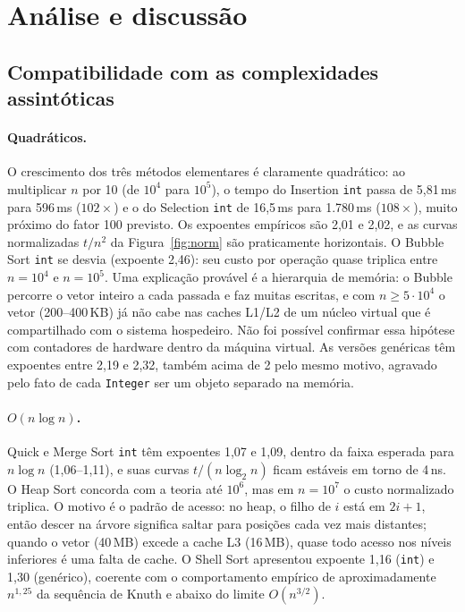 \documentclass[11pt,a4paper]{article}
\begin{document}
\section{Análise e discussão}

\subsection{Compatibilidade com as complexidades assintóticas}

\paragraph{Quadráticos.} O crescimento dos três métodos elementares é claramente quadrático: ao
multiplicar $n$ por 10 (de $10^4$ para $10^5$), o tempo do Insertion \texttt{int} passa de 5,81\,ms
para 596\,ms ($102\times$) e o do Selection \texttt{int} de 16,5\,ms para 1.780\,ms ($108\times$),
muito próximo do fator 100 previsto. Os expoentes empíricos são 2,01 e 2,02, e as curvas
normalizadas $t/n^2$ da Figura~\ref{fig:norm} são praticamente horizontais. O Bubble Sort
\texttt{int} se desvia (expoente 2,46): seu custo por operação quase triplica entre $n=10^4$ e
$n=10^5$. Uma explicação provável é a hierarquia de memória: o Bubble percorre o vetor inteiro a
cada passada e faz muitas escritas, e com $n \ge 5\cdot10^4$ o vetor (200--400\,KB) já não cabe nas
caches L1/L2 de um núcleo virtual que é compartilhado com o sistema hospedeiro. Não foi possível
confirmar essa hipótese com contadores de hardware dentro da máquina virtual. As versões genéricas
têm expoentes entre 2,19 e 2,32, também acima de 2 pelo mesmo motivo, agravado pelo fato de cada
\texttt{Integer} ser um objeto separado na memória.

\paragraph{$O(n\log n)$.} Quick e Merge Sort \texttt{int} têm expoentes 1,07 e 1,09, dentro da
faixa esperada para $n\log n$ (1,06--1,11), e suas curvas $t/(n\log_2 n)$ ficam estáveis em torno
de 4\,ns. O Heap Sort concorda com a teoria até $10^6$, mas em $n=10^7$ o custo normalizado
triplica. O motivo é o padrão de acesso: no heap, o filho de $i$ está em $2i+1$, então descer na
árvore significa saltar para posições cada vez mais distantes; quando o vetor (40\,MB) excede a
cache L3 (16\,MB), quase todo acesso nos níveis inferiores é uma falta de cache. O Shell Sort
apresentou expoente 1,16 (\texttt{int}) e 1,30 (genérico), coerente com o comportamento empírico de
aproximadamente $n^{1{,}25}$ da sequência de Knuth e abaixo do limite $O(n^{3/2})$.
\end{document}
